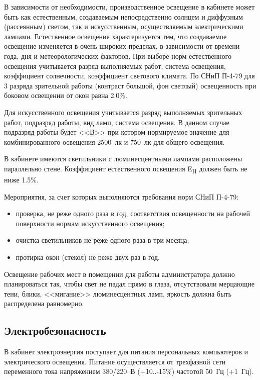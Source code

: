 В зависимости от необходимости, производственное освещение в кабинете может быть как естественным, создаваемым непосредственно солнцем и диффузным (рассеянным) светом, так и искусственным, осуществляемым электрическими лампами.
Естественное освещение характеризуется тем, что создаваемое освещение изменяется в очень широких пределах, в зависимости от времени года, дня и метеорологических факторов.
При выборе норм естественного освещения учитывается разряд выполняемых работ, система освещения, коэффициент солнечности, коэффициент светового климата.
По СНиП П-4-79 для 3 разряда зрительной работы (контраст большой, фон светлый) освещенность при боковом освещении от окон равна 2.0\%.

Для искусственного освещения учитывается разряд выполняемых зрительных работ, подразряд работы, вид ламп, система освещения.
В данном случае подразряд работы будет <<В>> при котором нормируемое значение для комбинированного освещения 2500~лк и 750~лк для общего освещения.

В кабинете имеются светильники с люминесцентными лампами расположены параллельно стене.
Коэффициент естественного освещения E\textsubscript{H} должен быть не ниже 1.5\%.

Мероприятия, за счет которых выполняются требования норм СНиП П-4-79:
\begin{itemize}
  \item проверка, не реже одного раза в год, соответствия освещенности на рабочей поверхности нормам искусственного освещения;
  \item очистка светильников не реже одного раза в три месяца;
  \item протирка окон (стекол) не реже двух раз в год.
\end{itemize}

Освещение рабочих мест в помещении для работы администратора должно планироваться так, чтобы свет не падал прямо в глаза, отсутствовали мерцающие тени, блики, <<мигание>> люминесцентных ламп, яркость должна быть распределена равномерно. 

\subsection{Электробезопасность}

В кабинет электроэнергия поступает для питания персональных компьютеров и электрического освещения.
Питание осуществляется от трехфазной сети переменного тока напряжением 380/220~В (+10..-15\%) частотой 50~Гц (+1~Гц).

